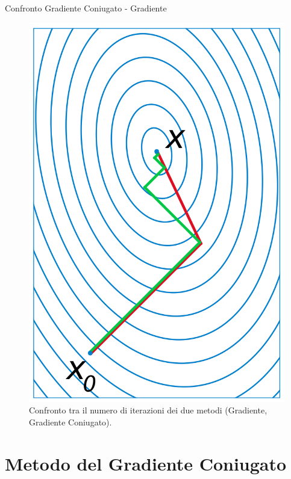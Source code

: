 \documentclass[10pt]{beamer}
\begin{document}
\begin{frame}{Confronto Gradiente Coniugato - Gradiente}
    \begin{figure}
    \centering
    \includegraphics[width=.35\linewidth]{cg_comp.png}
    \caption{Confronto tra il numero di iterazioni dei due metodi ({\color{green}Gradiente}, {\color{red}Gradiente Coniugato}).}

\end{figure}
\end{frame}


\section{Metodo del Gradiente Coniugato}\label{sec:sec2}
\end{document}

